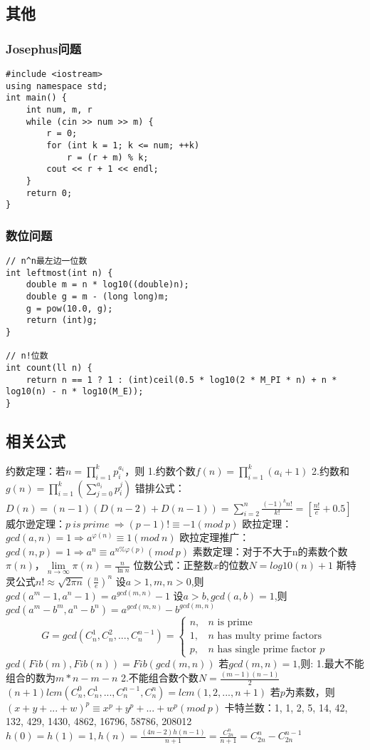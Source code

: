 \documentclass[a4]{article}
\begin{document}
\subsection{其他}
\subsubsection{Josephus问题}
\begin{lstlisting}
#include <iostream>
using namespace std;
int main() {
	int num, m, r
	while (cin >> num >> m) {
		r = 0;
		for (int k = 1; k <= num; ++k)
			r = (r + m) % k;
		cout << r + 1 << endl;
	}
	return 0;
}
\end{lstlisting}
\subsubsection{数位问题}
\begin{lstlisting}
// n^n最左边一位数
int leftmost(int n) {
	double m = n * log10((double)n);
	double g = m - (long long)m;
	g = pow(10.0, g);
	return (int)g;
}

// n!位数
int count(ll n) {
	return n == 1 ? 1 : (int)ceil(0.5 * log10(2 * M_PI * n) + n * log10(n) - n * log10(M_E));
}

\end{lstlisting}
\subsection{相关公式}
约数定理：若$n=\prod_{i=1}^kp_i^{a_i}$，则
1.约数个数$f(n)=\prod_{i=1}^k(a_i+1)$
2.约数和$g(n)=\prod_{i=1}^k(\sum_{j=0}^{a_i}p_i^j)$
错排公式：$D(n)=(n-1)(D(n-2)+D(n-1))=\sum_{i=2}^n\frac{(-1)^kn!}{k!}=[\frac{n!}{e}+0.5]$
威尔逊定理：$p\ is\ prime\ \Rightarrow (p-1)!\equiv-1(mod\ p)$
欧拉定理：$gcd(a,n)=1\Rightarrow a^{\varphi(n)}\equiv1(mod\ n)$
欧拉定理推广：$gcd(n,p)=1\Rightarrow a^n\equiv a^{n\%\varphi(p)}(mod\ p)$
素数定理：对于不大于n的素数个数$\pi(n)$，$\lim\limits_{n\to\infty}\pi(n)=\frac{n}{\ln n}$
位数公式：正整数$x$的位数$N=log10(n)+1$
斯特灵公式$n!\approx\sqrt{2\pi n}(\frac{n}{e})^n$
设$a>1,m,n>0$,则$gcd(a^m-1,a^n-1)=a^{gcd(m,n)}-1$
设$a>b,gcd(a,b)=1$,则$gcd(a^m-b^m,a^n-b^n)=a^{gcd(m,n)}-b^{gcd(m,n)}$
$$
G=gcd(C_n^1,C_n^2,...,C_n^{n-1})=
\begin{cases}
	n, & \text{$n$ is prime} \\
	1, & \text{$n$ has multy prime factors} \\
	p, & \text{$n$ has single prime factor $p$} 
\end{cases}
$$
$gcd(Fib(m),Fib(n))=Fib(gcd(m,n))$
若$gcd(m,n)=1$,则:
1.最大不能组合的数为$m*n-m-n$
2.不能组合数个数$N=\frac{(m-1)(n-1)}{2}$
$(n+1)lcm(C_n^0,C_n^1,...,C_n^{n-1},C_n^{n})=lcm(1,2,...,n+1)$
若$p$为素数，则$(x+y+...+w)^p\equiv x^p+y^p+...+w^p(mod\ p)$
卡特兰数：1, 1, 2, 5, 14, 42, 132, 429, 1430, 4862, 16796, 58786, 208012
$h(0)=h(1)=1,h(n)=\frac{(4n-2)h(n-1)}{n+1}=\frac{C_{2n}^n}{n+1}=C_{2n}^n-C_{2n}^{n-1}$\clearpage
\end{document}
